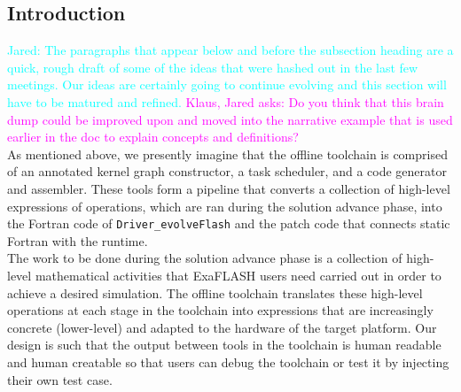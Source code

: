 \documentclass{article}
\newcommand{\code}[1]{{\tt#1}}
\newcommand{\FlashOfTheFuture}{ExaFLASH\xspace}
\newcommand{\ie}{\textit{i.e.}}   %
\newcommand{\Jared}[1]          {\textcolor{cyan}{Jared: #1}}
\newcommand{\KlausQfromJO}[1]   {\textcolor{magenta}{Klaus, Jared asks: #1}}
\begin{document}
\subsection{Introduction}

\Jared{The paragraphs that appear below and before the subsection heading are a
quick, rough draft of some of the ideas that were hashed out in the last few
meetings.  Our ideas are certainly going to continue evolving and this section
will have to be matured and refined.}
\KlausQfromJO{Do you think that this brain dump could be improved upon and moved into the
narrative example that is used earlier in the doc to explain concepts and
definitions?}\\

As mentioned above, we presently imagine that the offline toolchain is comprised
of an annotated kernel graph constructor, a task scheduler, and a code
generator and assembler.  These tools %
form a pipeline that converts a collection of high-level expressions of
operations, which are ran during the solution advance phase, into the Fortran
code of
\code{Driver\_evolveFlash} and the patch code
that connects static Fortran with
the runtime.\\

The work to be done during the solution advance
phase is a collection of high-level mathematical activities
that \FlashOfTheFuture users need carried out in order to achieve a desired simulation.
The offline toolchain translates these high-level operations at each stage in
the toolchain
into expressions that are increasingly concrete (lower-level) and adapted to the
hardware of the target platform.  Our design is such that the output between
tools in the toolchain
is
human readable and human creatable so that users
can debug the toolchain or test it by injecting their own test case.\\
\end{document}
